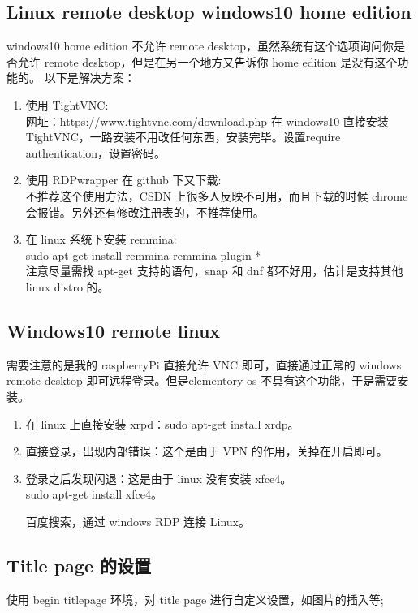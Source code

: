 \documentclass[UTF8,fancyhdr,a4paper]{ctexart}
\begin{document}
\subsection{Linux remote desktop windows10 home edition}
windows10 home edition 不允许 remote desktop，虽然系统有这个选项询问你是否允许 remote desktop，但是在另一个地方又告诉你 home edition 是没有这个功能的。
以下是解决方案：
\begin{enumerate}
\item 使用 TightVNC:\\
网址：https://www.tightvnc.com/download.php
在 windows10 直接安装 TightVNC，一路安装不用改任何东西，安装完毕。设置require authentication，设置密码。
\item 使用 RDPwrapper 在 github 下又下载:\\
不推荐这个使用方法，CSDN 上很多人反映不可用，而且下载的时候 chrome 会报错。另外还有修改注册表的，不推荐使用。
\item 在 linux 系统下安装 remmina:\\
sudo apt-get install remmina remmina-plugin-*\\
注意尽量需找 apt-get 支持的语句，snap 和 dnf 都不好用，估计是支持其他 linux distro 的。




\end{enumerate}

\subsection{Windows10 remote linux}
需要注意的是我的 raspberryPi 直接允许 VNC 即可，直接通过正常的 windows remote desktop 即可远程登录。但是elementory os 不具有这个功能，于是需要安装。
\begin{enumerate}
\item 在 linux 上直接安装 xrpd：sudo apt-get install xrdp。
\item 直接登录，出现内部错误：这个是由于 VPN 的作用，关掉在开启即可。
\item 登录之后发现闪退：这是由于 linux 没有安装 xfce4。\\ sudo apt-get install xfce4。\par
百度搜索，通过 windows RDP 连接 Linux。
\end{enumerate}


\subsection{Title page 的设置}
使用 begin titlepage 环境，对 title page 进行自定义设置，如图片的插入等;
\end{document}
